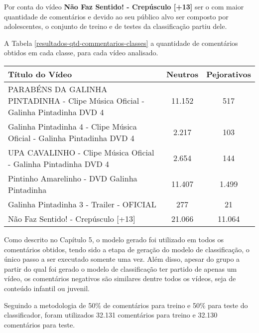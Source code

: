 Por conta do vídeo \textbf{Não Faz Sentido! - Crepúsculo [+13]} ser o com maior quantidade de comentários e devido ao seu público alvo ser composto por adolescentes, o conjunto de treino e de testes da classificação partiu dele. 

A Tabela \ref{resultados-qtd-commentarios-classes} a quantidade de comentários obtidos em cada classe, para cada vídeo analisado.

\begin{table}[H]
\begin{tabular}{|p{5.5cm}|c|c|}
\hline
\textbf{Título do Vídeo} & \textbf{Neutros} & \textbf{Pejorativos} \\ \hline
PARABÉNS DA GALINHA PINTADINHA - Clipe Música Oficial - Galinha Pintadinha DVD 4 & 11.152 & 517 \\ \hline
Galinha Pintadinha 4 - Clipe Música Oficial - Galinha Pintadinha DVD 4 & 2.217 & 103 \\ \hline
UPA CAVALINHO - Clipe Música Oficial - Galinha Pintadinha DVD 4 & 2.654 & 144 \\ \hline
Pintinho Amarelinho - DVD Galinha Pintadinha & 11.407 & 1.499 \\ \hline
Galinha Pintadinha 3 - Trailer - OFICIAL & 277 & 21 \\ \hline
Não Faz Sentido! - Crepúsculo [+13] & 21.066 & 11.064 \\ \hline

\end{tabular}

\end{table}


Como descrito no Capítulo 5, o modelo gerado foi utilizado em todos os comentários obtidos, tendo sido a etapa de geração do modelo de classificação, o único passo a ser executado somente uma vez. Além disso, apesar do grupo a partir do qual foi gerado o modelo de classificação ter partido de apenas um vídeo, os comentários negativos são similares dentre todos os vídeos, seja de conteúdo infantil ou juvenil.
\begin{comment}
\textcolor{red}{Não entendi Isaias, como você calculou recall e precision dos comentários dos outros projetos, se você não os avaliou com a SentiStregth... ou avaliou? Isso não fica claro e gera algumas dúvidas. Além disso, é bom dizer que mesmo que você tenha usado somente de um tipo de video, os comentários para criar o modelo e o testar, você tem comentários similares nos outros vídeos...}
\textcolor{pink}{I: Todos foram avaliados com Sentistrength, vou deixar mais explicito aqui e também na metodologia. Sobre os comentários similares, irei mencionar.}
\end{comment}
Seguindo a metodologia de 50\% de comentários para treino e 50\% para teste do classificador, foram utilizados 32.131 comentários para treino e 32.130 comentários para teste. 

